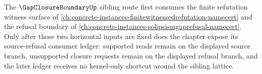The $\GapClosureBoundaryUp$ sibling route first consumes the finite refutation witness surface of \autoref{ch:concrete-instances-finitewitnessedrefutation-namecert} and the refusal boundary of \autoref{ch:concrete-instances-solipsismgaprefusal-namecert}. Only after those two horizontal inputs are fixed does the chapter expose its source-refusal consumer ledger: supported reads remain on the displayed source branch, unsupported closure requests remain on the displayed refusal branch, and the later ledger receives no kernel-only shortcut around the sibling lattice.

